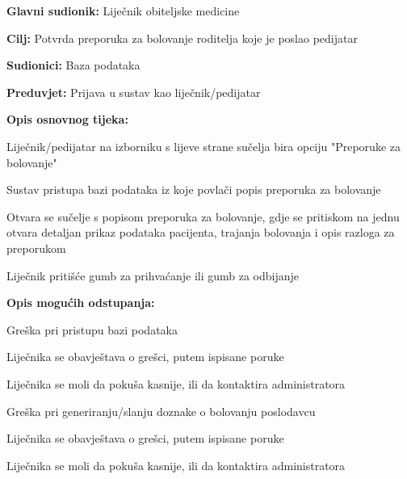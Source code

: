 					\noindent {}
					\begin{packed_item}
						
						\item \textbf{Glavni sudionik: }Liječnik obiteljske medicine
						\item  \textbf{Cilj:} Potvrda preporuka za bolovanje roditelja koje je poslao pedijatar
						\item  \textbf{Sudionici:} Baza podataka
						\item  \textbf{Preduvjet:} Prijava u sustav kao liječnik/pedijatar
						\item  \textbf{Opis osnovnog tijeka:}
						
						\item[] \begin{packed_enum}
							
							\item Liječnik/pedijatar na izborniku s lijeve strane sučelja bira opciju "Preporuke za bolovanje"
							\item Sustav pristupa bazi podataka iz koje povlači popis preporuka za bolovanje
							\item Otvara se sučelje s popisom preporuka za bolovanje, gdje se pritiskom na jednu otvara detaljan prikaz podataka pacijenta, trajanja bolovanja i opis razloga za preporukom
							\item Liječnik pritišće gumb za prihvaćanje ili gumb za odbijanje
							
						\end{packed_enum}
						
						\item  \textbf{Opis mogućih odstupanja:}
						\item[] \begin{packed_item}
							\item[2.a] Greška pri pristupu bazi podataka
							\item[] \begin{packed_enum}
								
								\item Liječnika se obavještava o grešci, putem ispisane poruke
								\item Liječnika se moli da pokuša kasnije, ili da kontaktira administratora
								
							\end{packed_enum}
							\item[4.a] Greška pri generiranju/slanju doznake o bolovanju poslodavcu
							\item[] \begin{packed_enum}
								
								\item Liječnika se obavještava o grešci, putem ispisane poruke
								\item Liječnika se moli da pokuša kasnije, ili da kontaktira administratora
								
							\end{packed_enum}
						\end{packed_item}
					\end{packed_item}
					
